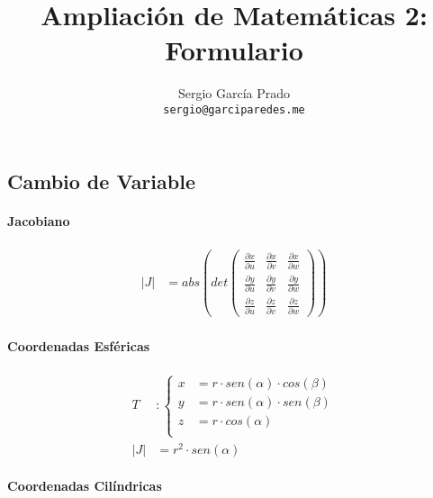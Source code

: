 \documentclass{article}
\title{Ampliación de Matemáticas 2: Formulario}
\author{Sergio García Prado \\ \texttt{sergio@garciparedes.me}}
\begin{document}
  \maketitle
  \begin{multicols}{2}


    \section{Cambio de Variable}

      \paragraph{Jacobiano}

      \begin{align*}
        \left|J\right| &= abs\left(det\left(
          \begin{array}{ccc}
            \frac{\partial x}{\partial u} & \frac{\partial x}{\partial v} & \frac{\partial x}{\partial w} \\
            \frac{\partial y}{\partial u} & \frac{\partial y}{\partial v} & \frac{\partial y}{\partial w} \\
            \frac{\partial z}{\partial u} & \frac{\partial z}{\partial v} & \frac{\partial z}{\partial w}
          \end{array}
        \right)\right)
      \end{align*}


      \paragraph{Coordenadas Esféricas}

        \begin{align*}
          T &:
          \begin{cases}
            x &= r \cdot sen(\alpha) \cdot cos(\beta) \\
            y &= r \cdot sen(\alpha) \cdot sen(\beta) \\
            z &= r \cdot cos(\alpha) \\
          \end{cases} \\
          \left|J\right| &= r ^ 2 \cdot sen(\alpha)
        \end{align*}

      \paragraph{Coordenadas Cilíndricas}


\end{multicols}
\end{document}
